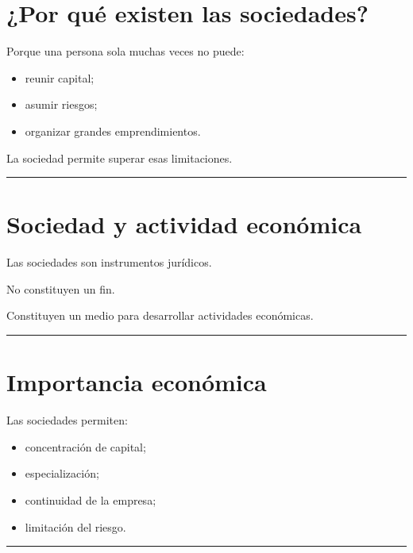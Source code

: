 \documentclass[
  spanish,
  letterpaper,
  DIV=11,
  numbers=noendperiod]{scrartcl}
\providecommand{\tightlist}{%
  \setlength{\itemsep}{0pt}\setlength{\parskip}{0pt}}
\begin{document}
\section{¿Por qué existen las
sociedades?}\label{por-quuxe9-existen-las-sociedades}

Porque una persona sola muchas veces no puede:

\begin{itemize}
\tightlist
\item
  reunir capital;
\item
  asumir riesgos;
\item
  organizar grandes emprendimientos.
\end{itemize}

La sociedad permite superar esas limitaciones.

\begin{center}\rule{0.5\linewidth}{0.5pt}\end{center}

\section{Sociedad y actividad
económica}\label{sociedad-y-actividad-econuxf3mica}

Las sociedades son instrumentos jurídicos.

No constituyen un fin.

Constituyen un medio para desarrollar actividades económicas.

\begin{center}\rule{0.5\linewidth}{0.5pt}\end{center}

\section{Importancia económica}\label{importancia-econuxf3mica}

Las sociedades permiten:

\begin{itemize}
\tightlist
\item
  concentración de capital;
\item
  especialización;
\item
  continuidad de la empresa;
\item
  limitación del riesgo.
\end{itemize}

\begin{center}\rule{0.5\linewidth}{0.5pt}\end{center}
\end{document}
